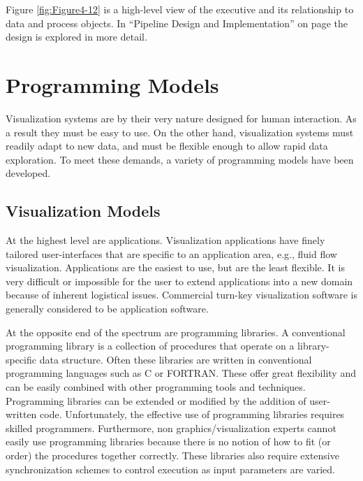 Figure \ref{fig:Figure4-12} is a high-level view of the executive and its relationship to data and process objects. In ``Pipeline Design and Implementation'' on page \pageref{subsec:pipeline_design_implementation} the design is explored in more detail.

\section{Programming Models}
\label{sec:programming_models}

Visualization systems are by their very nature designed for human interaction. As a result they must be easy to use. On the other hand, visualization systems must readily adapt to new data, and must be flexible enough to allow rapid data exploration. To meet these demands, a variety of programming models have been developed.

\subsection{Visualization Models}
\label{subsec:visualization_models}

At the highest level are applications. Visualization applications have finely tailored user-interfaces that are specific to an application area, e.g., fluid flow visualization. Applications are the easiest to use, but are the least flexible. It is very difficult or impossible for the user to extend applications into a new domain because of inherent logistical issues. Commercial turn-key visualization software is generally considered to be application software.

At the opposite end of the spectrum are programming libraries. A conventional programming library is a collection of procedures that operate on a library-specific data structure. Often these libraries are written in conventional programming languages such as C or FORTRAN. These offer great flexibility and can be easily combined with other programming tools and techniques. Programming libraries can be extended or modified by the addition of user-written code. Unfortunately, the effective use of programming libraries requires skilled programmers. Furthermore, non graphics/visualization experts cannot easily use programming libraries because there is no notion of how to fit (or order) the procedures together correctly. These libraries also require extensive synchronization schemes to control execution as input parameters are varied.

